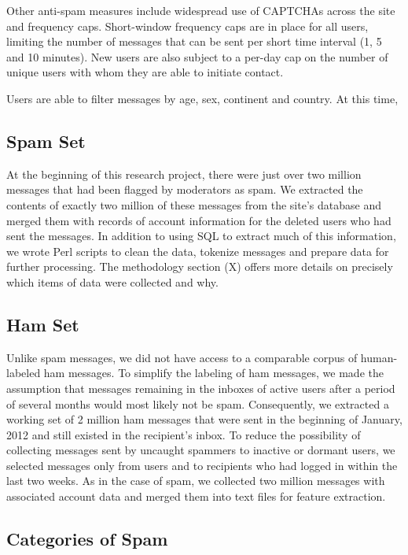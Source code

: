 \documentclass[preprint]{acm_proc_article-sp}
\begin{document}
Other anti-spam measures include widespread use of CAPTCHAs across the site and frequency caps. Short-window frequency caps are in place for all users, limiting the number of messages that can be sent per short time interval (1, 5 and 10 minutes). New users are also subject to a per-day cap on the number of unique users with whom they are able to initiate contact. 

Users are able to filter messages by age, sex, continent and country. At this time, 

\subsection{Spam Set}

At the beginning of this research project, there were just over two million messages that had been flagged by moderators as spam. We extracted the contents of exactly two million of these messages from the site's database and merged them with records of account information for the deleted users who had sent the messages. In addition to using SQL to extract much of this information, we wrote Perl scripts to clean the data, tokenize messages and prepare data for further processing. The methodology section (X) offers more details on precisely which items of data were collected and why.

\subsection{Ham Set}

Unlike spam messages, we did not have access to a comparable corpus of human-labeled ham messages. To simplify the labeling of ham messages, we made the assumption that messages remaining in the inboxes of active users after a period of several months would most likely not be spam. Consequently, we extracted a working set of 2 million ham messages that were sent in the beginning of January, 2012 and still existed in the recipient's inbox. To reduce the possibility of collecting messages sent by uncaught spammers to inactive or dormant users, we selected messages only from users and to recipients who had logged in within the last two weeks. As in the case of spam, we collected two million messages with associated account data and merged them into text files for feature extraction.

\subsection{Categories of Spam}
\end{document}
